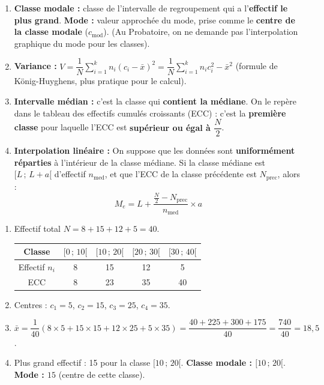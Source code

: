 \documentclass[11pt]{article}
\begin{document}
\begin{corrige}
\begin{enumerate}
\item \textbf{Classe modale :} classe de l'intervalle de regroupement qui a l'\textbf{effectif le plus grand}. \textbf{Mode :} valeur approchée du mode, prise comme le \textbf{centre de la classe modale} ($c_{\text{mod}}$). (Au Probatoire, on ne demande pas l'interpolation graphique du mode pour les classes).
\item \textbf{Variance :} $V = \dfrac{1}{N}\displaystyle\sum_{i=1}^{k} n_i (c_i - \bar{x})^2 = \dfrac{1}{N}\displaystyle\sum_{i=1}^{k} n_i c_i^2 - \bar{x}^2$ (formule de König-Huyghens, plus pratique pour le calcul).
\item \textbf{Intervalle médian :} c'est la classe qui \textbf{contient la médiane}. On le repère dans le tableau des effectifs cumulés croissants (ECC) : c'est la \textbf{première classe} pour laquelle l'ECC est \textbf{supérieur ou égal à $\dfrac{N}{2}$}.
\item \textbf{Interpolation linéaire :} On suppose que les données sont \textbf{uniformément réparties} à l'intérieur de la classe médiane. Si la classe médiane est $[L\,;\,L+a[$ d'effectif $n_{\text{med}}$, et que l'ECC de la classe précédente est $N_{\text{prec}}$, alors :
\[
M_e = L + \dfrac{\frac{N}{2} - N_{\text{prec}}}{n_{\text{med}}} \times a
\]
\end{enumerate}
\end{corrige}

\begin{corrige}
\begin{enumerate}
\item Effectif total $N = 8+15+12+5 = 40$.
\begin{center}
\begin{tabular}{|c|cccc|}\hline
Classe & $[0\,;\,10[$ & $[10\,;\,20[$ & $[20\,;\,30[$ & $[30\,;\,40[$ \\ \hline
Effectif $n_i$ & 8 & 15 & 12 & 5 \\
ECC & 8 & 23 & 35 & 40 \\ \hline
\end{tabular}
\end{center}
\item Centres : $c_1=5$, $c_2=15$, $c_3=25$, $c_4=35$.
\item $\bar{x} = \dfrac{1}{40}(8\times5 + 15\times15 + 12\times25 + 5\times35) = \dfrac{40+225+300+175}{40} = \dfrac{740}{40} = 18,5$.
\item Plus grand effectif : 15 pour la classe $[10\,;\,20[$. \textbf{Classe modale : $[10\,;\,20[$}. \textbf{Mode : $15$} (centre de cette classe).
\end{enumerate}
\end{corrige}
\end{document}
